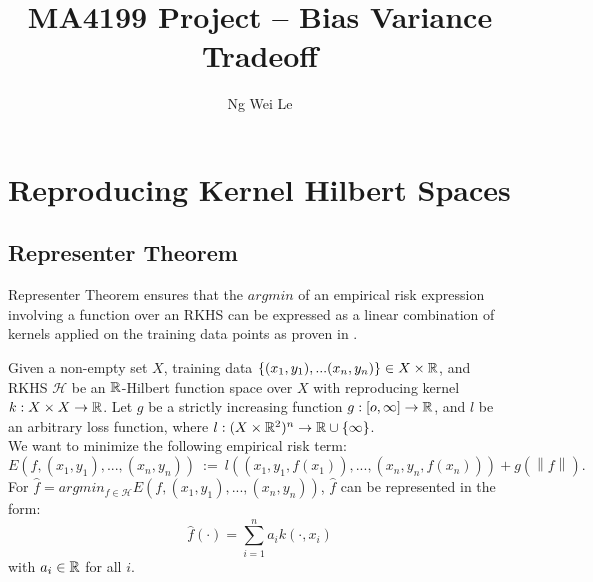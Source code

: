 \documentclass[english]{article}
\title{MA4199 Project -- Bias Variance Tradeoff}
\date{}
\author{Ng Wei Le}
\newcommand\norm[1]{\left\lVert#1\right\rVert}
\begin{document}
\maketitle
\section{Reproducing Kernel Hilbert Spaces} \label{sec:RKHS}
\subsection{Representer Theorem} \label{subsec:RepThm}
Representer Theorem ensures that the $argmin$ of an empirical risk expression involving a function over an RKHS can be expressed as a linear combination of kernels applied on the training data points as proven in \cite{Representer_Theorem}.
\begin{thm} \label{thm:Representer}
	Given a non-empty set $X$, training data $\{(x_1,y_1), ... (x_n,y_n)\} \in X \times \mathbb{R}$, and RKHS $\mathcal{H}$ be an $\mathbb{R}$-Hilbert function space over $X$ with reproducing kernel $k:X \times X \rightarrow \mathbb{R}$. Let $g$ be a strictly increasing function $g:[o, \infty]\rightarrow \mathbb{R}$, and $l$ be an arbitrary loss function, where $l:(X \times \mathbb{R}^2)^n \rightarrow \mathbb{R} \cup \{\infty\}$. \\
	We want to minimize the following empirical risk term:
	\[ E(f, (x_1, y_1), ..., (x_n, y_n)) ~ := ~ l((x_1, y_1, f(x_1)), ..., (x_n, y_n, f(x_n))) + g(\norm{f}) .\]
	For $\hat{f} = argmin_{f \in \mathcal{H}} E(f, (x_1, y_1), ..., (x_n, y_n))$, $\hat{f}$ can be represented in the form:
	\[ \hat{f}(\cdot) = \sum_{i=1}^{n} a_i k(\cdot, x_i) \]
	with $a_i \in \mathbb{R}$ for all $i$.
\end{thm}
\end{document}
